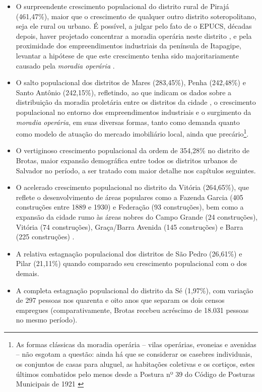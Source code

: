 \begin{itemize}
\item O surpreendente crescimento populacional do distrito rural de Pirajá (461,47\%), maior que o crescimento de qualquer outro distrito soteropolitano, seja ele rural ou urbano. É possível, a julgar pelo fato de o EPUCS, décadas depois, haver projetado concentrar a moradia operária neste distrito \cite{PREFEITURA1978,sampaio_formas_1999}, e pela proximidade dos empreendimentos industriais da península de Itapagipe, levantar a hipótese de que este crescimento tenha sido majoritariamente causado pela \textit{moradia operária} \cite{cardoso_vilas_1991}.
\item O salto populacional dos distritos de Mares (283,45\%), Penha (242,48\%) e Santo Antônio (242,15\%), refletindo, ao que indicam os dados sobre a distribuição da moradia proletária entre os distritos da cidade \cite[p.~126]{cardoso_vilas_1991}, o crescimento populacional no entorno dos empreendimentos industriais e o surgimento da \textit{moradia operária}, em suas diversas formas, tanto como demanda quanto como modelo de atuação do mercado imobiliário local, ainda que precário\footnote{As formas clássicas da moradia operária -- vilas operárias, evoneias e avenidas -- não esgotam a questão: ainda há que se considerar os casebres individuais, os conjuntos de casas para aluguel, as habitações coletivas e os cortiços, estes últimos combatidos pelo menos desde a Postura nº 39 do Código de Posturas Municipais de 1921 \cite{PREFEITURA1921}}.
\item O vertiginoso crescimento populacional da ordem de 354,28\% no distrito de Brotas, maior expansão demográfica entre todos os distritos urbanos de Salvador no período, a ser tratado com maior detalhe nos capítulos seguintes.
\item O acelerado crescimento populacional no distrito da Vitória (264,65\%), que reflete o desenvolvimento de áreas populares como a Fazenda Garcia (405 construções entre 1889 e 1930) e Federação (93 construções), bem como a expansão da cidade rumo às áreas nobres do Campo Grande (24 construções), Vitória (74 construções), Graça/Barra Avenida (145 construções) e Barra (225 construções) \cite[p.~295]{ALMEIDA1997}.
\item A relativa estagnação populacional dos distritos de São Pedro (26,61\%) e Pilar (21,11\%) quando comparado seu crescimento populacional com o dos demais. 
\item A completa estagnação populacional do distrito da Sé (1,97\%), com variação de 297 pessoas nos quarenta e oito anos que separam os dois censos empregues (comparativamente, Brotas recebeu acréscimo de 18.031 pessoas no mesmo período).

\end{itemize}
